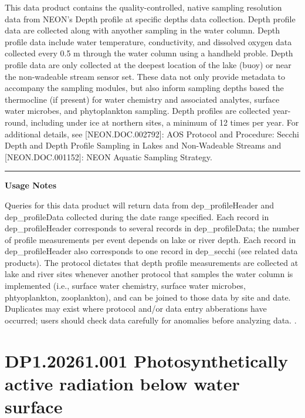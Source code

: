 \documentclass[]{article}
\begin{document}
This data product contains the quality-controlled, native sampling
resolution data from NEON's Depth profile at specific depths data
collection. Depth profile data are collected along with anyother
sampling in the water column. Depth profile data include water
temperature, conductivity, and dissolved oxygen data collected every 0.5
m through the water column using a handheld proble. Depth profile data
are only collected at the deepest location of the lake (buoy) or near
the non-wadeable stream sensor set. These data not only provide metadata
to accompany the sampling modules, but also inform sampling depths based
the thermocline (if present) for water chemistry and associated
analytes, surface water microbes, and phytoplankton sampling. Depth
profiles are collected year-round, including under ice at northern
sites, a minimum of 12 times per year. For additional details, see
{[}NEON.DOC.002792{]}: AOS Protocol and Procedure: Secchi Depth and
Depth Profile Sampling in Lakes and Non-Wadeable Streams and
{[}NEON.DOC.001152{]}: NEON Aquatic Sampling Strategy.

\begin{center}\rule{0.5\linewidth}{\linethickness}\end{center}

\textbf{Usage Notes}

Queries for this data product will return data from dep\_profileHeader
and dep\_profileData collected during the date range specified. Each
record in dep\_profileHeader corresponds to several records in
dep\_profileData; the number of profile measurements per event depends
on lake or river depth. Each record in dep\_profileHeader also
corresponds to one record in dep\_secchi (see related data products).
The protocol dictates that depth profile measurements are collected at
lake and river sites whenever another protocol that samples the water
column is implemented (i.e., surface water chemistry, surface water
microbes, phtyoplankton, zooplankton), and can be joined to those data
by site and date. Duplicates may exist where protocol and/or data entry
abberations have occurred; users should check data carefully for
anomalies before analyzing data. \newpage
.

\section{DP1.20261.001 Photosynthetically active radiation below water
surface}\label{dp1.20261.001-photosynthetically-active-radiation-below-water-surface}
\end{document}
